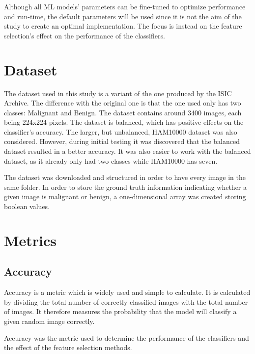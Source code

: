 \documentclass{kththesis}
\begin{document}
Although all ML models’ parameters can be fine-tuned to optimize performance and run-time, the default parameters will be used since it is not the aim of the study to create an optimal implementation. The focus is instead on the feature selection’s effect on the performance of the classifiers.


\section{Dataset}

The dataset used in this study is a variant of the one produced by the ISIC Archive. The difference with the original one is that the one used only has two classes: Malignant and Benign. The dataset contains around 3400 images, each being 224x224 pixels. The dataset is balanced, which has positive effects on the classifier's accuracy. The larger, but unbalanced, HAM10000 dataset was also considered. However, during initial testing it was discovered that the balanced dataset resulted in a better accuracy. It was also easier to work with the balanced dataset, as it already only had two classes while HAM10000 has seven.

The dataset was downloaded and structured in order to have every image in the same folder. In order to store the ground truth information indicating whether a given image is malignant or benign, a one-dimensional array was created storing boolean values.

\section{Metrics}

\subsection{Accuracy}

Accuracy is a metric which is widely used and simple to calculate.
It is calculated by dividing the total number of correctly classified images with the total number of images. 
It therefore measures the probability that the model will classify a given random image correctly. \parencite{takiddin2021artificial}

Accuracy was the metric used to determine the performance of the classifiers and the effect of the feature selection methods.
\end{document}
